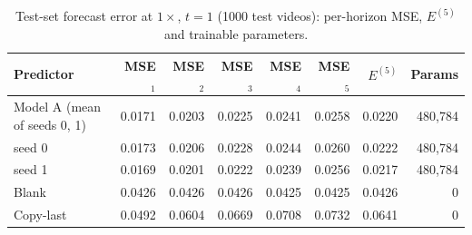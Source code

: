 \begin{table}[H]\centering\small
\caption{Test-set forecast error at $1\times$, $t=1$ (1000 test videos): per-horizon MSE, $E^{(5)}$ and trainable parameters.}\label{tab:t2}
\begin{tabular}{lrrrrrrr}\toprule
Predictor & MSE$_1$ & MSE$_2$ & MSE$_3$ & MSE$_4$ & MSE$_5$ & $E^{(5)}$ & Params \\ \midrule
Model A (mean of seeds 0, 1) & 0.0171 & 0.0203 & 0.0225 & 0.0241 & 0.0258 & 0.0220 & 480{,}784 \\
\quad seed 0 & 0.0173 & 0.0206 & 0.0228 & 0.0244 & 0.0260 & 0.0222 & 480{,}784 \\
\quad seed 1 & 0.0169 & 0.0201 & 0.0222 & 0.0239 & 0.0256 & 0.0217 & 480{,}784 \\
Blank & 0.0426 & 0.0426 & 0.0426 & 0.0425 & 0.0425 & 0.0426 & 0 \\
Copy-last & 0.0492 & 0.0604 & 0.0669 & 0.0708 & 0.0732 & 0.0641 & 0 \\
\bottomrule\end{tabular}
\end{table}